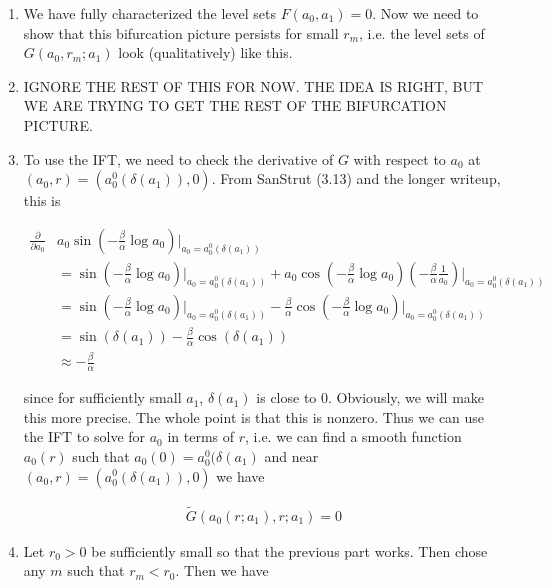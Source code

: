 \documentclass[12pt]{article}
\begin{document}
\begin{enumerate}
\item We have fully characterized the level sets $F(a_0, a_1) = 0$. Now we need to show that this bifurcation picture persists for small $r_m$, i.e. the level sets of $G(a_0, r_m; a_1)$ look (qualitatively) like this.\\





\item IGNORE THE REST OF THIS FOR NOW. THE IDEA IS RIGHT, BUT WE ARE TRYING TO GET THE REST OF THE BIFURCATION PICTURE.

\item To use the IFT, we need to check the derivative of $G$ with respect to $a_0$ at $(a_0, r) = (a_0^0(\delta(a_1)), 0)$. From SanStrut (3.13) and the longer writeup, this is 

\begin{align*}
\frac{\partial}{\partial a_0} &a_0 \sin \left( -\frac{\beta}{\alpha} \log a_0 \right)\Big|_{a_0 = a_0^0(\delta(a_1))} \\
&= \sin \left( - \frac{\beta}{\alpha} \log a_0 \right)\Big|_{a_0 = a_0^0(\delta(a_1))}  + a_0 \cos \left( - \frac{\beta}{\alpha} \log a_0 \right)\left( -\frac{\beta}{\alpha} \frac{1}{a_0} \right) \Big|_{a_0 = a_0^0(\delta(a_1))} \\
&= \sin \left( - \frac{\beta}{\alpha} \log a_0 \right) \Big|_{a_0 = a_0^0(\delta(a_1))}  -\frac{\beta}{\alpha} \cos \left( - \frac{\beta}{\alpha} \log a_0 \right) \Big|_{a_0 = a_0^0(\delta(a_1))} \\
&= \sin \left( \delta(a_1) \right) -\frac{\beta}{\alpha} \cos \left( \delta(a_1) \right) \\
&\approx -\frac{\beta}{\alpha}
\end{align*}

since for sufficiently small $a_1$, $\delta(a_1)$ is close to 0. Obviously, we will make this more precise. The whole point is that this is nonzero. Thus we can use the IFT to solve for $a_0$ in terms of $r$, i.e. we can find a smooth function $a_0(r)$ such that $a_0(0) = a_0^0(\delta(a_1)$ and near $(a_0, r) = (a_0^0(\delta(a_1)), 0)$ we have

\begin{align*}
\tilde{G}(a_0(r; a_1), r; a_1) = 0
\end{align*}

\item Let $r_0 > 0$ be sufficiently small so that the previous part works. Then chose any $m$ such that $r_m < r_0$. Then we have


\end{enumerate}
\end{document}
